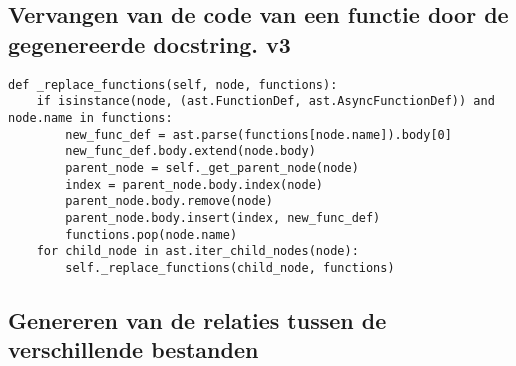 \subsection{Vervangen van de code van een functie door de gegenereerde docstring. v3}
\label{bijlage:vervangen-v3}
\begin{verbatim}
def _replace_functions(self, node, functions):
    if isinstance(node, (ast.FunctionDef, ast.AsyncFunctionDef)) and node.name in functions:
        new_func_def = ast.parse(functions[node.name]).body[0]
        new_func_def.body.extend(node.body)
        parent_node = self._get_parent_node(node)
        index = parent_node.body.index(node)
        parent_node.body.remove(node)
        parent_node.body.insert(index, new_func_def)
        functions.pop(node.name)
    for child_node in ast.iter_child_nodes(node):
        self._replace_functions(child_node, functions)
\end{verbatim}

\subsection{Genereren van de relaties tussen de verschillende bestanden}
\label{bijlage:generate-file-relations}

